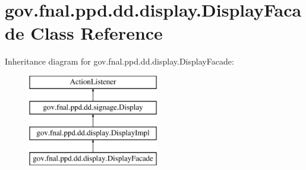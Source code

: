 \hypertarget{classgov_1_1fnal_1_1ppd_1_1dd_1_1display_1_1DisplayFacade}{\section{gov.\-fnal.\-ppd.\-dd.\-display.\-Display\-Facade Class Reference}
\label{classgov_1_1fnal_1_1ppd_1_1dd_1_1display_1_1DisplayFacade}
}
Inheritance diagram for gov.\-fnal.\-ppd.\-dd.\-display.\-Display\-Facade\-:\begin{figure}[H]
\begin{center}
\leavevmode
\includegraphics[height=4.000000cm]{classgov_1_1fnal_1_1ppd_1_1dd_1_1display_1_1DisplayFacade}
\end{center}
\end{figure}
